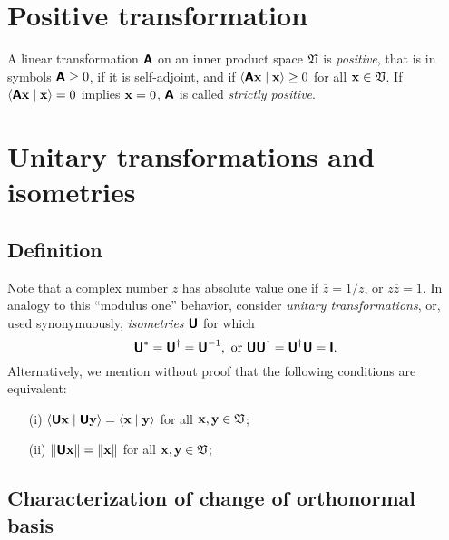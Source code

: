 \section{Positive transformation}

A linear transformation  $\textsf{\textbf{A}}$ on an inner product space ${\frak V}$ is {\em positive},
that is in symbols $\textsf{\textbf{A}}\ge 0$, if it is self-adjoint,
and if $\langle \textsf{\textbf{A}}{\bf x}\mid {\bf x}\rangle  \ge 0$ for all ${\bf x}\in {\frak V}$.
If  $\langle \textsf{\textbf{A}}{\bf x}\mid {\bf x}\rangle = 0$ implies
${\bf x}=0$, $\textsf{\textbf{A}}$ is called {\em strictly positive}.

\section{Unitary transformations and isometries}

\subsection {Definition}
Note that a complex number $z$ has absolute value one if $\overline{z}=1/z$, or $z\overline{z}=1$.
In analogy to this ``modulus one'' behavior,
consider {\em unitary transformations}, or, used synonymuously, {\em isometries}
$\textsf{\textbf{U}}$ for which
\begin{equation}
\textsf{\textbf{U}}^*= \textsf{\textbf{U}}^\dagger =\textsf{\textbf{U}}^{-1},
\textrm{ or } \textsf{\textbf{U}}\textsf{\textbf{U}}^\dagger =\textsf{\textbf{U}}^\dagger \textsf{\textbf{U}}=\textsf{\textbf{I}}.
\end{equation}
Alternatively, we mention without proof that the following conditions are equivalent:
\begin{itemize}
\item[(i)]
$\langle \textsf{\textbf{U}}{\bf x}\mid \textsf{\textbf{U}}{\bf y} \rangle
=
\langle {\bf x}\mid {\bf y} \rangle$ for all ${\bf x} ,{\bf y} \in {\frak V}$;
\item[(ii)]
$\| \textsf{\textbf{U}}{\bf x}\|
=
\|{\bf x}\|$ for all ${\bf x} ,{\bf y} \in {\frak V}$;
\end{itemize}

\subsection {Characterization of change of orthonormal basis}

